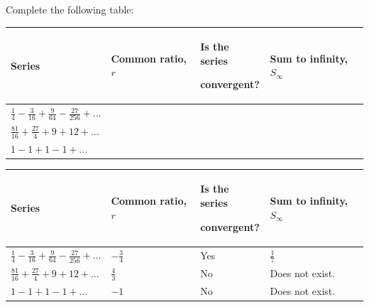 \documentclass[11pt,a4paper]{book}
\begin{document}
\begin{example}

Complete the following table:

\bigskip

\setlength{\extrarowheight}{12pt}

\begin{tabular}{|>{\centering}p{4.5cm}|>{\centering}p{3cm}|>{\centering}m{3cm}|>{\centering}p{3.5cm}|}
\hline 
Series

\medskip{} & Common ratio, $r$ & Is the series

convergent? & Sum to infinity, $S_{\infty}$\tabularnewline
\hline 
${\displaystyle \frac{1}{4}-\frac{3}{16}+\frac{9}{64}-\frac{27}{256}+\ldots}$

\medskip{} &  &  & \tabularnewline
\hline 
${\displaystyle \frac{81}{16}+\frac{27}{4}+9+12+\ldots}$

\medskip{} &  &  & \tabularnewline
\hline 
$1-1+1-1+\ldots$

\medskip{} &  &  & \tabularnewline
\hline 
\end{tabular}

\bigskip

\Solution

\setlength{\extrarowheight}{12pt}

\begin{tabular}{|>{\centering}p{4.5cm}|>{\centering}p{3cm}|>{\centering}m{3cm}|>{\centering}p{3.5cm}|}
\hline 
Series

\medskip{} & Common ratio, $r$ & Is the series

convergent? & Sum to infinity, $S_{\infty}$\tabularnewline
\hline 
${\displaystyle \frac{1}{4}-\frac{3}{16}+\frac{9}{64}-\frac{27}{256}+\ldots}$

\medskip{} & ${\displaystyle -\frac{3}{4}}$ & Yes & ${\displaystyle \frac{1}{7}}$

\medskip{}\tabularnewline
\hline 
${\displaystyle \frac{81}{16}+\frac{27}{4}+9+12+\ldots}$

\medskip{} & ${\displaystyle \frac{4}{3}}$ & No & Does not exist.

\medskip{}\tabularnewline
\hline 
$1-1+1-1+\ldots$

\medskip{} & $-1$ & No & Does not exist.

\medskip{}\tabularnewline
\hline 
\end{tabular}

\end{example}
\end{document}
